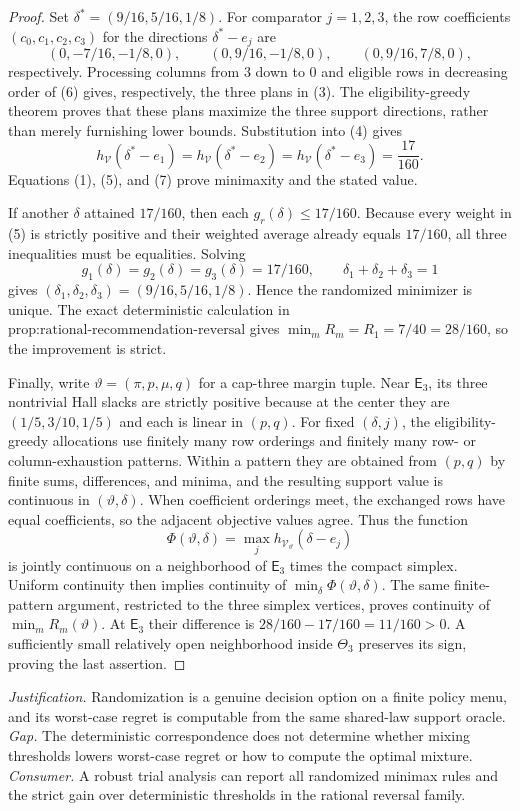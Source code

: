 \documentclass{article}
\begin{document}
\begin{proof}
Set \(\delta^*=(9/16,5/16,1/8)\). For comparator \(j=1,2,3\), the row coefficients \((c_0,c_1,c_2,c_3)\) for the directions \(\delta^*-e_j\) are
\[
 (0,-7/16,-1/8,0),\qquad
 (0,9/16,-1/8,0),\qquad
 (0,9/16,7/8,0),                                          \tag{6}
\]
respectively. Processing columns from \(3\) down to \(0\) and eligible rows in decreasing order of (6) gives, respectively, the three plans in (3). The eligibility-greedy theorem proves that these plans maximize the three support directions, rather than merely furnishing lower bounds. Substitution into (4) gives
\[
 h_{\mathcal V}(\delta^*-e_1)
 =h_{\mathcal V}(\delta^*-e_2)
 =h_{\mathcal V}(\delta^*-e_3)=\frac{17}{160}.            \tag{7}
\]
Equations (1), (5), and (7) prove minimaxity and the stated value.

If another \(\delta\) attained \(17/160\), then each \(g_r(\delta)\le17/160\). Because every weight in (5) is strictly positive and their weighted average already equals \(17/160\), all three inequalities must be equalities. Solving
\[
 g_1(\delta)=g_2(\delta)=g_3(\delta)=17/160,\qquad
 \delta_1+\delta_2+\delta_3=1                            \tag{8}
\]
gives \((\delta_1,\delta_2,\delta_3)=(9/16,5/16,1/8)\). Hence the randomized minimizer is unique. The exact deterministic calculation in \(\text{prop:rational-recommendation-reversal}\) gives \(\min_mR_m=R_1=7/40=28/160\), so the improvement is strict.

Finally, write \(\vartheta=(\pi,p,\mu,q)\) for a cap-three margin tuple. Near \(\mathsf E_3\), its three nontrivial Hall slacks are strictly positive because at the center they are \((1/5,3/10,1/5)\) and each is linear in \((p,q)\). For fixed \((\delta,j)\), the eligibility-greedy allocations use finitely many row orderings and finitely many row- or column-exhaustion patterns. Within a pattern they are obtained from \((p,q)\) by finite sums, differences, and minima, and the resulting support value is continuous in \((\vartheta,\delta)\). When coefficient orderings meet, the exchanged rows have equal coefficients, so the adjacent objective values agree. Thus the function
\[
 \Phi(\vartheta,\delta)=\max_jh_{\mathcal V_\vartheta}(\delta-e_j) \tag{9}
\]
is jointly continuous on a neighborhood of \(\mathsf E_3\) times the compact simplex. Uniform continuity then implies continuity of \(\min_\delta\Phi(\vartheta,\delta)\). The same finite-pattern argument, restricted to the three simplex vertices, proves continuity of \(\min_mR_m(\vartheta)\). At \(\mathsf E_3\) their difference is \(28/160-17/160=11/160>0\). A sufficiently small relatively open neighborhood inside \(\Theta_3\) preserves its sign, proving the last assertion.
\end{proof}
\par\smallskip\noindent \textit{Justification.} Randomization is a genuine decision option on a finite policy menu, and its worst-case regret is computable from the same shared-law support oracle. \textit{Gap.} The deterministic correspondence does not determine whether mixing thresholds lowers worst-case regret or how to compute the optimal mixture. \textit{Consumer.} A robust trial analysis can report all randomized minimax rules and the strict gain over deterministic thresholds in the rational reversal family.
\end{document}
